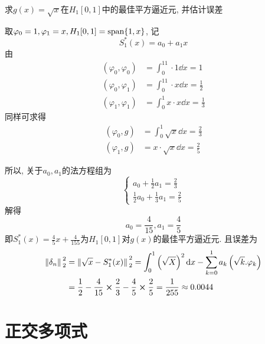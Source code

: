 \begin{example}
    求$g(x)=\sqrt{x}$在$H_1[0,1]$中的最佳平方逼近元, 并估计误差
\end{example}

\begin{solution}
    取$\varphi_0=1,\varphi_1=x, H_1[0,1]=\text{span}\{1,x\}$, 记
    \begin{equation*}
        S_1^*(x)=a_0+a_1x
    \end{equation*}
    由
    \begin{align*}
        (\varphi_0,\varphi_0)&=\int_0^11\cdot1\dd{x}=1\\
        (\varphi_0,\varphi_1)&=\int_0^11\cdot x\dd{x}=\frac{1}{2}\\
        (\varphi_1,\varphi_1)&=\int_0^1x\cdot x\dd{x}=\frac{1}{3}
    \end{align*}
    同样可求得
    \begin{align*}
        (\varphi_0,g)&=\int_0^1\sqrt{x}\dd{x}=\frac{2}{3}\\
        (\varphi_1,g)&=x\cdot\sqrt{x}\dd{x}=\frac{2}{5}
    \end{align*}

    所以, 关于$a_0,a_1$的法方程组为
    \begin{equation*}
        \begin{cases}
            a_0+\frac{1}{2}a_1=\frac{2}{3}\\
            \frac{1}{2}a_0+\frac{1}{3}a_1=\frac{2}{5}
        \end{cases}
    \end{equation*}
    解得
    \begin{equation*}
        a_0=\frac{4}{15}, a_1=\frac{4}{5}
    \end{equation*}
    即$S_1^*(x)=\frac{4}{5}x+\frac{4}{155}$为$H_1[0,1]$对$g(x)$的最佳平方逼近元. 且误差为
    \begin{align*}
        \norm*{\delta_n}_2^2&=\norm*{\sqrt{x}-S_1^*(x)}_2^2=\int_0^1\left(\sqrt{X}\right)^2\dd{x}-\sum_{k=0}^1a_k\left(\sqrt{k}.\varphi_k\right)\\
        &=\frac{1}{2}-\frac{4}{15}\cross\frac{2}{3}-\frac{4}{5}\cross\frac{2}{5}=\frac{1}{255}\approx0.0044
    \end{align*}
\end{solution}

\section{正交多项式}

